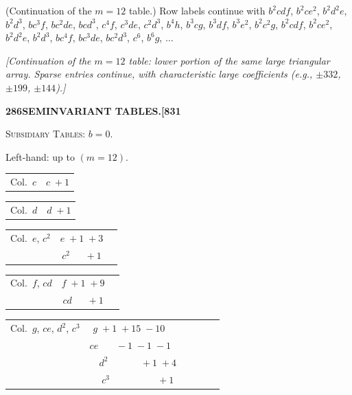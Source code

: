\documentclass[11pt]{article}
\begin{document}
\noindent (Continuation of the $m=12$ table.) Row labels continue with $b^{2}cdf$, $b^{2}ce^{2}$, $b^{2}d^{2}e$, $b^{2}d^{3}$, $bc^{3}f$, $bc^{2}de$, $bcd^{3}$, $c^{4}f$, $c^{3}de$, $c^{2}d^{3}$, $b^{4}h$, $b^{3}cg$, $b^{3}df$, $b^{3}e^{2}$, $b^{2}c^{2}g$, $b^{2}cdf$, $b^{2}ce^{2}$, $b^{2}d^{2}e$, $b^{2}d^{3}$, $bc^{4}f$, $bc^{3}de$, $bc^{2}d^{3}$, $c^{6}$, $b^{6}g$, $\ldots$

\medskip

\noindent\textit{[Continuation of the $m=12$ table: lower portion of the same large triangular array. Sparse entries continue, with characteristic large coefficients (e.g., $\pm 332$, $\pm 199$, $\pm 144$).]}

\bigskip

\newpage

\noindent\textbf{286}\hfill\textbf{SEMINVARIANT TABLES.}\hfill\textbf{[831}

\bigskip

\begin{center}
\textsc{Subsidiary Tables}: $b = 0$.
\end{center}

\medskip

\noindent Left-hand: up to $(m = 12)$.

\medskip

\begin{center}
\begin{tabular}{c|c}
Col.\ $c$ & $c \;+1$ \\
\end{tabular}
\quad
\begin{tabular}{c|c}
Col.\ $d$ & $d \;+1$ \\
\end{tabular}
\quad
\begin{tabular}{c|cc}
Col.\ $e$, $c^{2}$ & $e \;+1\;+3$ \\
                  & $c^{2}\;\phantom{+1}+1$ \\
\end{tabular}
\end{center}

\medskip

\begin{center}
\begin{tabular}{c|cc}
Col.\ $f$, $cd$ & $f \;+1\;+9$ \\
                & $cd\;\phantom{+1}+1$ \\
\end{tabular}
\quad
\begin{tabular}{c|cccc}
Col.\ $g$, $ce$, $d^{2}$, $c^{3}$ & $g \;+1\;+15\;-10\;\phantom{+1}\;$ \\
                 & $ce\;\phantom{+1}\;-1\;-1\;-1\;\phantom{+1}$ \\
                 & $d^{2}\;\phantom{+1}\;\phantom{+1}\;+1\;+4$ \\
                 & $c^{3}\;\phantom{+1}\;\phantom{+1}\;\phantom{+1}\;+1$ \\
\end{tabular}
\end{center}
\end{document}
